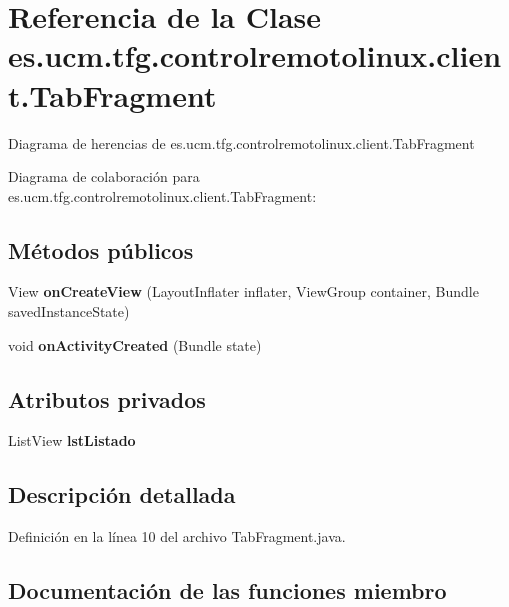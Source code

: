 \section{Referencia de la Clase es.\-ucm.\-tfg.\-controlremotolinux.\-client.\-Tab\-Fragment}
\label{classes_1_1ucm_1_1tfg_1_1controlremotolinux_1_1client_1_1TabFragment}


Diagrama de herencias de es.\-ucm.\-tfg.\-controlremotolinux.\-client.\-Tab\-Fragment


Diagrama de colaboración para es.\-ucm.\-tfg.\-controlremotolinux.\-client.\-Tab\-Fragment\-:
\subsection*{Métodos públicos}
\begin{DoxyCompactItemize}
\item 
View {\bf on\-Create\-View} (Layout\-Inflater inflater, View\-Group container, Bundle saved\-Instance\-State)
\item 
void {\bf on\-Activity\-Created} (Bundle state)
\end{DoxyCompactItemize}
\subsection*{Atributos privados}
\begin{DoxyCompactItemize}
\item 
List\-View {\bf lst\-Listado}
\end{DoxyCompactItemize}


\subsection{Descripción detallada}


Definición en la línea 10 del archivo Tab\-Fragment.\-java.



\subsection{Documentación de las funciones miembro}

